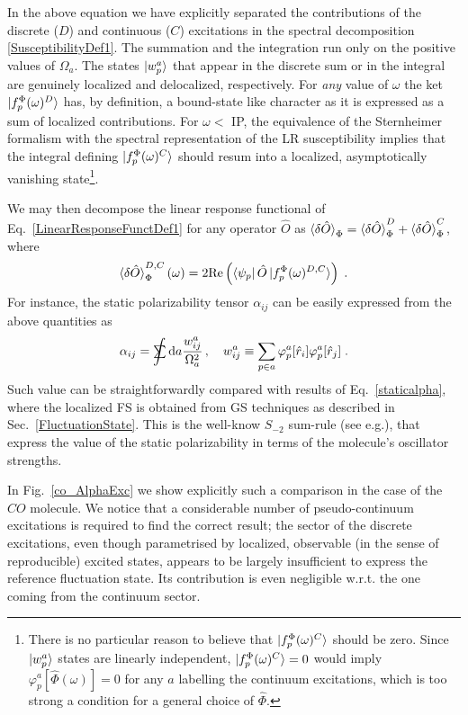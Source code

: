 \documentclass[reprint,aps,prb]{revtex4-1}
\newcommand{\dd}{{\rm d}}
\newcommand{\sint}{\mathrlap{\displaystyle\int}
\mathrlap{\textstyle\sum}
\phantom{\mathrlap{\displaystyle
\int}\textstyle\sum}}
\newcommand{\be}{\begin{equation}}
\newcommand{\ee}{\end{equation}}
\newcommand{\lb}{\label}
\newcommand{\op}[1]{\hat {#1}}
\newcommand{\fscd}[1]{\ket{f_p^\Phi(\omega)^{#1}}}
\begin{document}
In the above equation we have explicitly separated the contributions of the discrete ($D$) and continuous ($C$) excitations 
in the spectral decomposition \eqref{SusceptibilityDef1}.
The summation and the integration run only on the positive values of $\Omega_a$.
The states $\ket{w_p^a}$ that appear in the discrete sum 
or in the integral are genuinely localized and delocalized, respectively.
For \emph{any} value of $\omega$ the ket $\fscd{D}$ has, by definition, a bound-state like
character as it is expressed as a sum of localized contributions.
For $\omega <$ IP, the equivalence of the Sternheimer formalism with the spectral representation of the LR susceptibility implies that the integral defining
$\fscd{C}$ should resum into a localized, asymptotically vanishing state\footnote{There is no particular reason to believe that $\fscd{C}$ should be
zero. Since $\ket{w_p^a}$ states are linearly independent, 
$\fscd{C}=0$ would imply
$\varphi_p^a[\op \Phi(\omega)]=0$ for any $a$ labelling the continuum excitations,
which is too strong a condition for a general choice of $\op \Phi$.}.

We may then decompose the linear response functional of Eq.~\eqref{LinearResponseFunctDef1}
for any operator $\op O$ as $\braket{\delta\op O}_\Phi=\braket{\delta\op O}^D_\Phi +
\braket{\delta\op O}^C_\Phi$, where
\be
\braket{\delta\op O}^{D,C}_\Phi(\omega) = 
2 \mathrm{Re}\left(\bra{\psi_p} \op O \fscd{D,C} \right)\;.
\ee
For instance, the static polarizability tensor $\alpha_{ij}$ can be easily expressed
from the above quantities as
\be\lb{sminus2}
\alpha_{ij} = \sint \dd a \frac{w^a_{ij}}{\Omega_a^2}\,, \quad w^a_{ij} \equiv \sum_{p\in a} \varphi_p^a[\op r_i]\varphi_p^a[\op r_j]\;.
\ee
Such value can be straightforwardly compared with results of Eq.~\eqref{staticalpha}, where the localized FS is obtained from GS techniques as 
described in Sec.~\ref{FluctuationState}.
This is the well-know $S_{-2}$ sum-rule (see e.g.\cite{Wagner2012}), that express the value of the static polarizability
in terms of the molecule's oscillator strengths.

In Fig.~\ref{co_AlphaExc} we show explicitly such a comparison in the case of the $CO$ molecule.
We notice that a considerable number of pseudo-continuum excitations is required
to find the correct result; the sector of the discrete excitations, even though 
parametrised by localized, observable (in the sense of reproducible) excited states,
appears to be largely insufficient to express the reference fluctuation state. Its contribution is even negligible w.r.t.
the one coming from the continuum sector.
\end{document}
